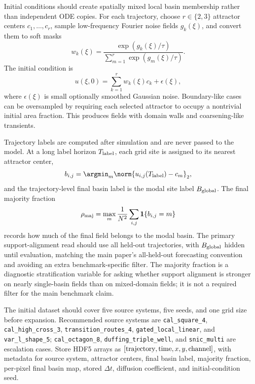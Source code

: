 Initial conditions should create spatially mixed local basin membership rather than independent ODE copies. For each trajectory, choose \(r\in\{2,3\}\) attractor centers \(c_1,\ldots,c_r\), sample low-frequency Fourier noise fields \(g_k(\xi)\), and convert them to soft masks
\begin{equation}
  w_k(\xi)=
  \frac{\exp(g_k(\xi)/\tau)}
       {\sum_{m=1}^r \exp(g_m(\xi)/\tau)}.
\end{equation}
The initial condition is
\begin{equation}
  u(\xi,0)=\sum_{k=1}^r w_k(\xi)c_k+\epsilon(\xi),
\end{equation}
where \(\epsilon(\xi)\) is small optionally smoothed Gaussian noise. Boundary-like cases can be oversampled by requiring each selected attractor to occupy a nontrivial initial area fraction. This produces fields with domain walls and coarsening-like transients.

Trajectory labels are computed after simulation and are never passed to the model. At a long label horizon \(T_{\rm label}\), each grid site is assigned to its nearest attractor center,
\begin{equation}
  b_{i,j}=\argmin_m \norm{u_{i,j}(T_{\rm label})-c_m}_2,
\end{equation}
and the trajectory-level final basin label is the modal site label \(B_{\rm global}\). The final majority fraction
\begin{equation}
  \rho_{\rm maj}=\max_m \frac{1}{N^2}\sum_{i,j}\mathbf{1}\{b_{i,j}=m\}
\end{equation}
records how much of the final field belongs to the modal basin. The primary support-alignment read should use all held-out trajectories, with \(B_{\rm global}\) hidden until evaluation, matching the main paper's all-held-out forecasting convention and avoiding an extra benchmark-specific filter. The majority fraction is a diagnostic stratification variable for asking whether support alignment is stronger on nearly single-basin fields than on mixed-domain fields; it is not a required filter for the main benchmark claim.

The initial dataset should cover five source systems, five seeds, and one grid size before expansion. Recommended source systems are \texttt{cal\_square\_4}, \texttt{cal\_high\_cross\_3}, \texttt{transition\_routes\_4}, \texttt{gated\_local\_linear}, and \texttt{var\_l\_shape\_5}; \texttt{cal\_octagon\_8}, \texttt{duffing\_triple\_well}, and \texttt{snic\_multi} are escalation cases. Store HDF5 arrays as \([{\rm trajectory},{\rm time},x,y,{\rm channel}]\), with metadata for source system, attractor centers, final basin label, majority fraction, per-pixel final basin map, stored \(\Delta t\), diffusion coefficient, and initial-condition seed.

